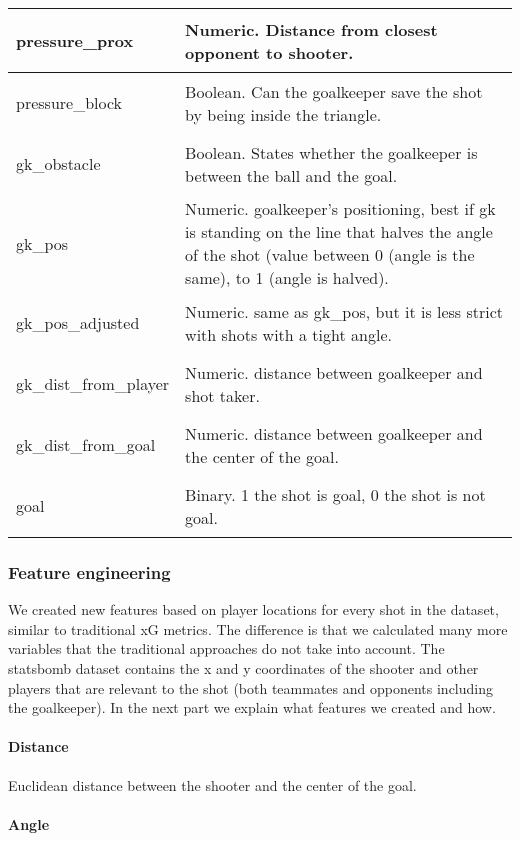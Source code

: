 \documentclass[]{article}
\let\oldparagraph\paragraph
\renewcommand{\paragraph}[1]{\oldparagraph{#1}\mbox{}}
\begin{document}
\begin{table}
\begin{tabular}[t]{>{\bfseries\raggedright\arraybackslash}p{3cm}|l}
\hline
pressure\_prox & Numeric. Distance from closest opponent to shooter.\\
\hline
pressure\_block & Boolean. Can the goalkeeper save the shot by being inside the triangle.\\
\hline
gk\_obstacle & Boolean. States whether the goalkeeper is between the ball and the goal.\\
\hline
gk\_pos & Numeric. goalkeeper's positioning, best if gk is standing on the line that halves the angle of the shot (value between 0 (angle is the same), to 1 (angle is halved).\\
\hline
gk\_pos\_adjusted & Numeric. same as gk\_pos, but it is less strict with shots with a tight angle.\\
\hline
gk\_dist\_from\_player & Numeric. distance between goalkeeper and shot taker.\\
\hline
gk\_dist\_from\_goal & Numeric. distance between goalkeeper and the center of the goal.\\
\hline
goal & Binary. 1 the shot is goal, 0 the shot is not goal.\\
\hline
\end{tabular}
\end{table}

\hypertarget{feature-engineering}{%
\subsubsection{Feature engineering}\label{feature-engineering}}

We created new features based on player locations for every shot in the
dataset, similar to traditional xG metrics. The difference is that we
calculated many more variables that the traditional approaches do not
take into account. The statsbomb dataset contains the x and y
coordinates of the shooter and other players that are relevant to the
shot (both teammates and opponents including the goalkeeper). In the
next part we explain what features we created and how.

\hypertarget{distance}{%
\paragraph{Distance}\label{distance}}

Euclidean distance between the shooter and the center of the goal.

\hypertarget{angle}{%
\paragraph{Angle}\label{angle}}
\end{document}
